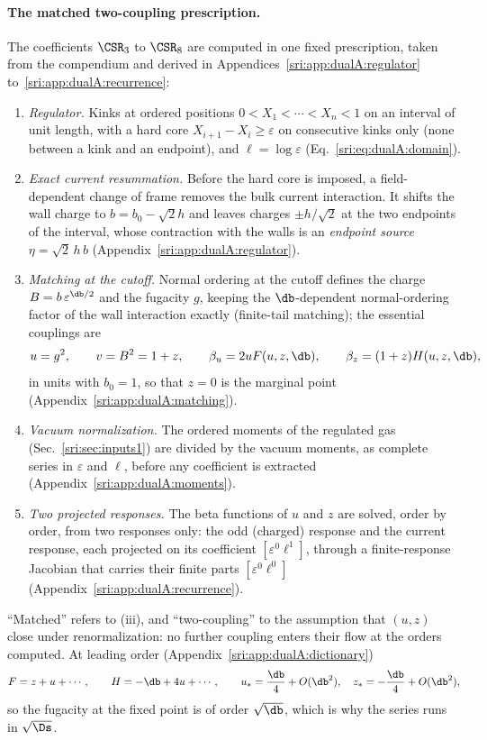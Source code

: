\paragraph{The matched two-coupling prescription.} The coefficients $\CSR_3$ to $\CSR_8$ are computed in one fixed
prescription, taken from the compendium and derived in Appendices~\ref{sri:app:dualA:regulator}
to~\ref{sri:app:dualA:recurrence}:
\begin{enumerate}[label=(\roman*),leftmargin=2em]
\item \emph{Regulator.} Kinks at ordered positions $0<X_1<\cdots<X_n<1$ on an interval of unit length, with a hard core
 $X_{i+1}-X_i\ge\varepsilon$ on consecutive kinks only (none between a kink and an endpoint), and $\ell=\log\varepsilon$
 (Eq.~\eqref{sri:eq:dualA:domain}).
\item \emph{Exact current resummation.} Before the hard core is imposed, a field-dependent change of frame removes the
 bulk current interaction. It shifts the wall charge to $b=b_0-\sqrt2h$ and leaves charges $\pm h/\sqrt2$ at the two
 endpoints of the interval, whose contraction with the walls is an \emph{endpoint source} $\eta=\sqrt2\,h\,b$
 (Appendix~\ref{sri:app:dualA:regulator}).
\item \emph{Matching at the cutoff.} Normal ordering at the cutoff defines the charge $B=b\,\varepsilon^{\db/2}$ and
 the fugacity $g$, keeping the $\db$-dependent normal-ordering factor of the wall interaction exactly (finite-tail
 matching); the essential couplings are
 \begin{equation}
  u=g^2,\qquad v=B^2=1+z,\qquad \beta_u=2uF(u,z,\db),\qquad \beta_z=(1+z)H(u,z,\db),
 \end{equation}
 in units with $b_0=1$, so that $z=0$ is the marginal point (Appendix~\ref{sri:app:dualA:matching}).
\item \emph{Vacuum normalization.} The ordered moments of the regulated gas (Sec.~\ref{sri:sec:inputs1}) are divided by the
 vacuum moments, as complete series in $\varepsilon$ and $\ell$, before any coefficient is extracted
 (Appendix~\ref{sri:app:dualA:moments}).
\item \emph{Two projected responses.} The beta functions of $u$ and $z$ are solved, order by order, from two responses
 only: the odd (charged) response and the current response, each projected on its coefficient
 $[\varepsilon^0\ell^1]$, through a finite-response Jacobian that carries their finite parts $[\varepsilon^0\ell^0]$
 (Appendix~\ref{sri:app:dualA:recurrence}).
\end{enumerate}
``Matched'' refers to (iii), and ``two-coupling'' to the assumption that $(u,z)$ close under renormalization: no
further coupling enters their flow at the orders computed. At leading order
(Appendix~\ref{sri:app:dualA:dictionary})
\begin{equation}
 F=z+u+\cdots,\qquad H=-\db+4u+\cdots,\qquad u_*=\frac{\db}{4}+O(\db^2),\quad z_*=-\frac{\db}{4}+O(\db^2),
\end{equation}
so the fugacity at the fixed point is of order $\sqrt{\db}$, which is why the series runs in $\sqrt{\Ds}$.

